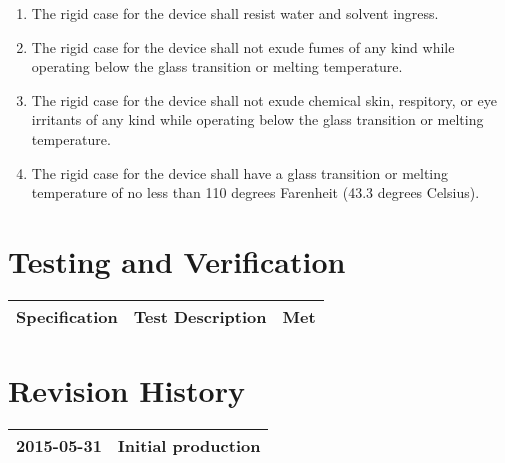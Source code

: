 \documentclass[twoside]{article}
\begin{document}
\begin{enumerate}
\begin{enumerate}
  \item The rigid case for the device shall resist water and solvent ingress.

  \item The rigid case for the device shall not exude fumes of any kind while operating below the glass transition or melting temperature.

  \item The rigid case for the device shall not exude chemical skin, respitory, or eye irritants of any kind while operating below the glass transition or melting temperature.

  \item The rigid case for the device shall have a glass transition or melting temperature of no less than 110 degrees Farenheit (43.3 degrees Celsius).

  \end{enumerate}

\end{enumerate}



\section{Testing and Verification}

\center
\begin{tabular}{|c|p{10cm}|c|}
  \hline
  Specification & Test Description & Met \\\hline

\end{tabular}



\section{Revision History}

\center
\begin{tabular}{|c|p{10cm}|}
  \hline
  2015-05-31 & Initial production \\\hline

\end{tabular}


{}


\end{document}
